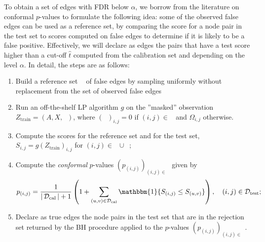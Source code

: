 \documentclass[a4paper, 11pt]{article}
\theoremstyle{remark}
\DeclareMathOperator{\ind}{\mathbbm{1}}
\DeclareMathOperator{\Dtr}{\cD_{\text{train}}}
\DeclareMathOperator{\Dcal}{\cD_{\text{cal}}}
\DeclareMathOperator{\Dtest}{\cD_{\text{test}}}
\newcommand{\Ztr}{Z_{\text{train}}}
\DeclareMathOperator{\Otr}{\Omega_{\text{train}}}
\DeclareMathOperator{\cDNull}{\cD^0}
\newcommand{\EM}{\ensuremath}
\newcommand{\cD}{\EM{\mathcal{D}}}
\begin{document}
To obtain a set of edges with FDR below $\alpha$, we borrow from the literature on %
conformal $p$-values \citep{bates2023testing, marandon22a} to formulate the following idea: some of the observed false edges can be used as a reference set, %
by comparing the score for a node pair in the test set to scores computed on false edges to determine if it is likely to be a false positive. 
%
Effectively, we will declare as edges the pairs that have a test score higher than a cut-off $\hat t$ computed from the calibration set and depending on the level $\alpha$. In detail, the steps are as follows:
\begin{enumerate}
\item Build a reference set $\Dcal$ of false edges by sampling uniformly without replacement from the set of observed false edges $\cDNull$


\item Run an off-the-shelf LP algorithm $g$ on the ''masked'' observation $\Ztr=(A,X,\Otr)$, where $(\Otr)_{i,j}= 0$ if $(i,j) \in \Dcal$ and $\Omega_{i,j}$ otherwise.

\item Compute the scores for the reference set and for the test set, $S_{i,j} = g(\Ztr)_{i,j}$ for $(i,j) \in \Dcal \cup \Dtest$; 
\item Compute the \textit{conformal} $p$-values $(p_{(i,j)})_{(i,j) \in \Dtest}$ given by
\begin{align} \label{lp:eq:confpvalues}
    p_{(i,j)} = \frac{1}{\vert \Dcal \vert +1} \left(1 + \sum_{(u,v) \in \Dcal} \ind \{S_{(i,j)} \leq S_{(u,v)} \} \right), 
    \quad (i,j) \in \Dtest ;
\end{align}
\item Declare as true edges the node pairs in the test set that are in the rejection set returned by the BH procedure applied to the $p$-values $(p_{(i,j)})_{(i,j) \in \Dtest}$. 
\end{enumerate}
\end{document}
